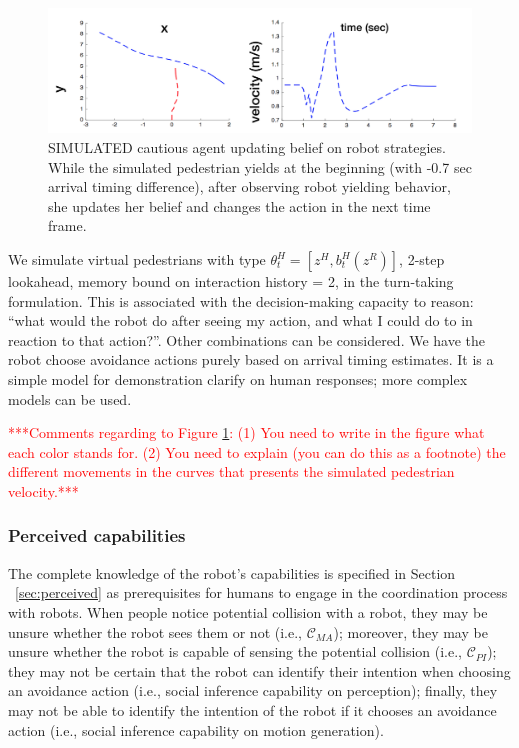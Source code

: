 \documentclass[letterpaper, 10 pt, conference]{ieeeconf}  %
\begin{document}
\begin{figure}[t]
      \centering
      \hspace{-5em}
      \vspace{-1.3em}
      \includegraphics[scale=0.33]{adaptation}
      \hspace{-5em}
      \caption{SIMULATED cautious agent updating belief on robot strategies. While the simulated pedestrian yields at the 
      beginning (with -0.7 sec arrival timing difference), after observing 
      robot yielding behavior, she updates her 
      belief and changes the action in the next time frame.}
      \vspace{-2em}
     \label{fig:adaptation}
\end{figure}

We simulate virtual pedestrians with type $\theta^H_t = [z^H, b^H_t(z^R)]$, 2-step lookahead, memory bound on interaction history = 2, in the turn-taking formulation. This is associated with the decision-making capacity to reason: ``what would the robot do after seeing my action, and what I could do to in reaction to that action?''. Other combinations can be considered. We have the robot choose avoidance actions purely based on arrival timing estimates. It is a simple model for demonstration clarify on human responses; more complex models can be used.

\textcolor{red}{***Comments regarding to Figure \ref{fig:adaptation}: (1) You need to write in the figure what each color stands for. (2) You need to explain (you can do this as a footnote) the different movements in the curves that presents the simulated pedestrian velocity.***}

\subsubsection{Perceived capabilities}
The complete knowledge of the robot's capabilities is specified in Section 
~\ref{sec:perceived} as prerequisites for humans to engage in the 
coordination process with robots. When people notice potential collision with 
a robot, they may be unsure whether the robot sees them or not (i.e., 
$\mathcal{C}_{MA}$); moreover, they may be unsure whether the robot is capable 
of sensing the potential collision (i.e., $\mathcal{C}_{PI}$); they may not be 
certain that the robot can identify their intention when choosing 
an avoidance action (i.e., 
social inference capability on perception); finally, they may not be able to 
identify the intention of the robot if it chooses an avoidance action (i.e., 
social inference capability on motion generation). 
\end{document}
